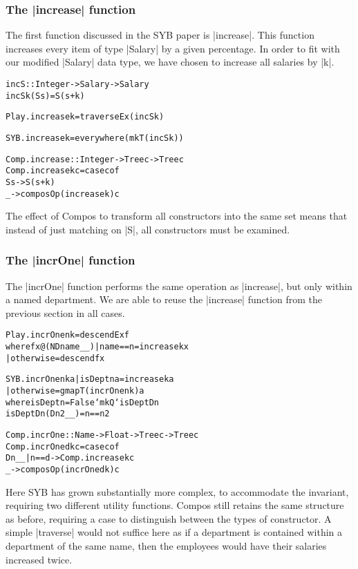 \documentclass[preprint]{sigplanconf}
\newenvironment{code}{\begin{alltt}\small}{\end{alltt}}
\begin{document}
\subsubsection{The |increase| function}

The first function discussed in the SYB paper is |increase|. This function increases every item of type |Salary| by a given percentage. In order to fit with our modified |Salary| data type, we have chosen to increase all salaries by |k|.

\begin{code}
incS :: Integer -> Salary -> Salary
incS k (S s) = S (s + k)

Play.increase k = traverseEx (incS k)

SYB.increase k = everywhere (mkT (incS k))

Comp.increase :: Integer -> Tree c -> Tree c
Comp.increase k c = case c of
    S s -> S (s + k)
    _ -> composOp (increase k) c
\end{code}

The effect of Compos to transform all constructors into the same set means that instead of just matching on |S|, all constructors must be examined.

\subsubsection{The |incrOne| function}

The |incrOne| function performs the same operation as |increase|, but only within a named department. We are able to reuse the |increase| function from the previous section in all cases.

\begin{code}
Play.incrOne n k = descendEx f
    where f x@(ND name _ _)  | name == n  = increase k x
                             | otherwise  = descend f x

SYB.incrOne n k a  | isDept n a  = increase k a
                   | otherwise   = gmapT (incrOne n k) a
    where  isDept n = False `mkQ` isDeptD n
           isDeptD n (D n2 _ _) = n == n2

Comp.incrOne :: Name -> Float -> Tree c -> Tree c
Comp.incrOne d k c = case c of
    D n _ _ | n == d -> Comp.increase k c
    _ -> composOp (incrOne d k) c
\end{code}

Here SYB has grown substantially more complex, to accommodate the invariant, requiring two different utility functions. Compos still retains the same structure as before, requiring a case to distinguish between the types of constructor. A simple |traverse| would not suffice here as if a department is contained within a department of the same name, then the employees would have their salaries increased twice.
\end{document}
